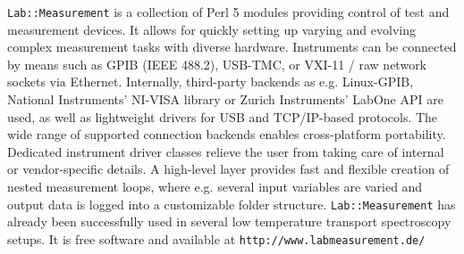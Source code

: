 \documentclass{scdpg}
\begin{document}
\begin{scAbstract}
{}


\scBeginText

\texttt{Lab::Measurement} is a collection of Perl 5 modules providing control of test 
and
measurement devices. It allows for quickly setting up varying and evolving
complex measurement tasks with diverse hardware. Instruments can be connected 
by means such as GPIB (IEEE 488.2), USB-TMC, or VXI-11 / raw network sockets 
via
Ethernet. Internally, third-party backends as e.g. Linux-GPIB, National 
Instruments' NI-VISA library or Zurich Instruments' LabOne API are used, as 
well
as lightweight drivers for USB and TCP/IP-based protocols. The wide range of 
supported connection backends enables cross-platform portability. Dedicated 
instrument driver classes relieve the user from taking care of internal or 
vendor-specific details. A high-level layer provides fast and flexible creation
of nested measurement loops, where e.g. several input variables are varied and
output data is logged into a customizable folder
structure. \texttt{Lab::Measurement} has 
already been successfully used in several low temperature transport 
spectroscopy
setups. It is free software and available at \texttt{http://www.labmeasurement.de/}

\scEndText
{}
\end{scAbstract}
\end{document}
